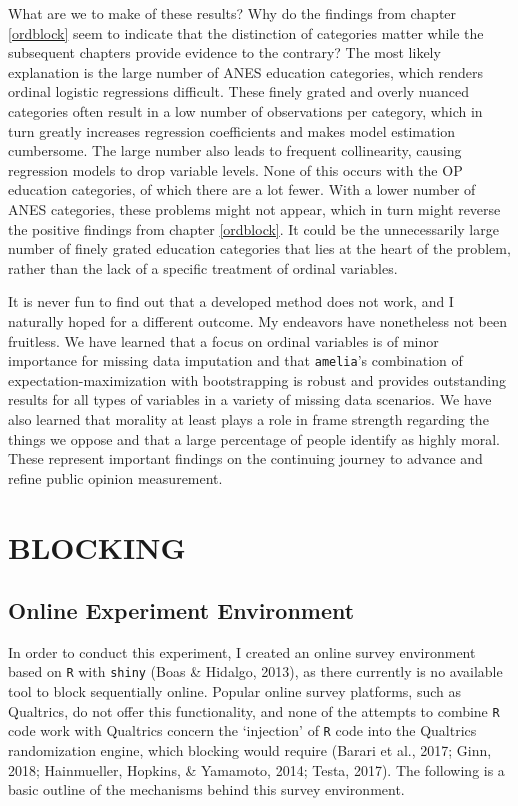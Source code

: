\documentclass[12pt,econ]{sources/authesis}
\begin{document}
What are we to make of these results? Why do the findings from chapter \ref{ordblock} seem to indicate that the distinction of categories matter while the subsequent chapters provide evidence to the contrary? The most likely explanation is the large number of ANES education categories, which renders ordinal logistic regressions difficult. These finely grated and overly nuanced categories often result in a low number of observations per category, which in turn greatly increases regression coefficients and makes model estimation cumbersome. The large number also leads to frequent collinearity, causing regression models to drop variable levels. None of this occurs with the OP education categories, of which there are a lot fewer. With a lower number of ANES categories, these problems might not appear, which in turn might reverse the positive findings from chapter \ref{ordblock}. It could be the unnecessarily large number of finely grated education categories that lies at the heart of the problem, rather than the lack of a specific treatment of ordinal variables.

It is never fun to find out that a developed method does not work, and I naturally hoped for a different outcome. My endeavors have nonetheless not been fruitless. We have learned that a focus on ordinal variables is of minor importance for missing data imputation and that \texttt{amelia}'s combination of expectation-maximization with bootstrapping is robust and provides outstanding results for all types of variables in a variety of missing data scenarios. We have also learned that morality at least plays a role in frame strength regarding the things we oppose and that a large percentage of people identify as highly moral. These represent important findings on the continuing journey to advance and refine public opinion measurement.

\appendix

\hypertarget{app-ordblock}{%
\chapter{BLOCKING}\label{app-ordblock}}

\hypertarget{app-ordblock-env}{%
\section{Online Experiment Environment}\label{app-ordblock-env}}

In order to conduct this experiment, I created an online survey environment based on \texttt{R} with \texttt{shiny} (Boas \& Hidalgo, 2013), as there currently is no available tool to block sequentially online. Popular online survey platforms, such as Qualtrics, do not offer this functionality, and none of the attempts to combine \texttt{R} code work with Qualtrics concern the `injection' of \texttt{R} code into the Qualtrics randomization engine, which blocking would require (Barari et al., 2017; Ginn, 2018; Hainmueller, Hopkins, \& Yamamoto, 2014; Testa, 2017). The following is a basic outline of the mechanisms behind this survey environment.
\end{document}
